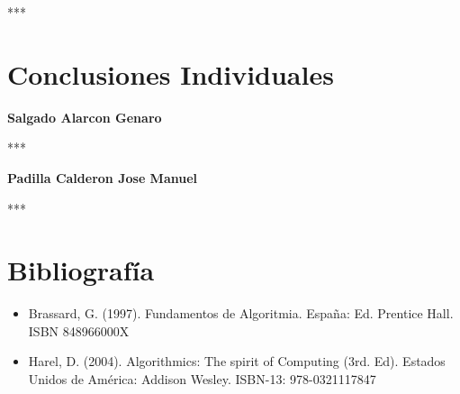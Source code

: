 \documentclass[spanish]{article}
\begin{document}
	\bigskip

	***

	\bigskip

	\newpage

	\section{Conclusiones Individuales}

	\bigskip

	{\large{\bf Salgado Alarcon Genaro}}\\

	\bigskip

	***

	\bigskip

	{\large{\bf Padilla Calderon Jose Manuel}}\\
	
	\bigskip

	***

	\bigskip


	\section{Bibliografía}
	\begin{itemize}
		\item Brassard, G. (1997). Fundamentos de Algoritmia. España: Ed. Prentice Hall. ISBN 		848966000X
		\item Harel, D. (2004). Algorithmics: The spirit of Computing (3rd. Ed). Estados Unidos de América: Addison
Wesley. ISBN-13: 978-0321117847
	\end{itemize}
\end{document}
